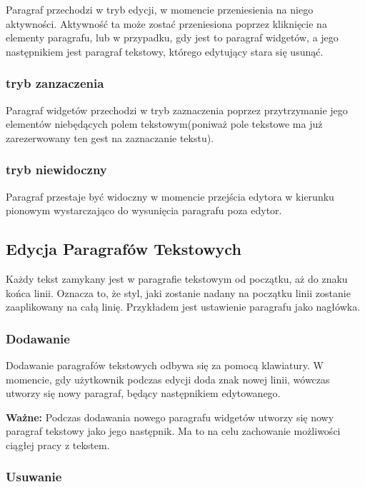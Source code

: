 Paragraf przechodzi w tryb edycji, w momencie przeniesienia na niego aktywności.
Aktywność ta może zostać przeniesiona poprzez kliknięcie na elementy paragrafu, lub w przypadku, gdy jest to paragraf widgetów, a jego następnikiem jest paragraf tekstowy, którego edytujący stara się usunąć.

\subsubsection{tryb zanzaczenia}

Paragraf widgetów przechodzi w tryb zaznaczenia poprzez przytrzymanie jego elementów niebędących polem tekstowym(poniważ pole tekstowe ma już zarezerwowany ten gest na zaznaczanie tekstu).

\subsubsection{tryb niewidoczny}

Paragraf przestaje być widoczny w momencie przejścia edytora w kierunku pionowym wystarczająco do wysunięcia paragrafu poza edytor.

\pagebreak

\subsection{Edycja Paragrafów Tekstowych}

Każdy tekst zamykany jest w paragrafie tekstowym od początku, aż do znaku końca linii. Oznacza to, że styl, jaki zostanie nadany na początku linii zostanie zaaplikowany na całą linię. Przykładem jest ustawienie paragrafu jako nagłówka.

\subsubsection{Dodawanie}

Dodawanie paragrafów tekstowych odbywa się za pomocą klawiatury. W momencie, gdy użytkownik podczas edycji doda znak nowej linii, wówczas utworzy się nowy paragraf, będący następnikiem edytowanego.

\textbf{Ważne:} Podczas dodawania nowego paragrafu widgetów utworzy się nowy paragraf tekstowy jako jego następnik. Ma to na celu zachowanie możliwości ciągłej pracy z tekstem.

\subsubsection{Usuwanie}

